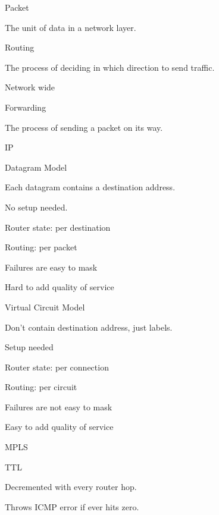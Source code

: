 \documentclass[main.tex]{subfiles}
\begin{document}
\small


\begin{card}{Packet}
\item The unit of data in a network layer.
\end{card}

\begin{card}{Routing}
\item The process of deciding in which direction to send traffic.
\item Network wide
\end{card}

\begin{card}{Forwarding}
\item The process of sending a packet on its way.
\end{card}

\begin{card}{IP}
\TODO
\end{card}

\begin{card}{Datagram Model}
\item Each datagram contains a destination address.
\item No setup needed.
\item Router state: per destination
\item Routing: per packet
\item Failures are easy to mask
\item Hard to add quality of service
\end{card}

\begin{card}{Virtual Circuit Model}
\item Don't contain destination address, just labels.
\item Setup needed
\item Router state: per connection
\item Routing: per circuit
\item Failures are not easy to mask
\item Easy to add quality of service
\end{card}

\begin{card}{MPLS}
\TODO
\end{card}

\begin{card}{TTL}
\item Decremented with every router hop.
\item Throws ICMP error if ever hits zero.
\end{card}
\end{document}
